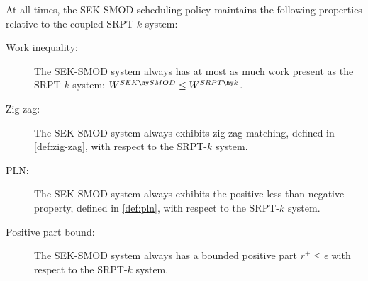 \documentclass[acmsmall]{acmart}
\begin{document}
\begin{lemma}
    \label{lem:sek-bridge}
    At all times, the SEK-SMOD scheduling policy maintains the following properties relative
    to the coupled SRPT-$k$ system:
    \begin{description}
        \item[Work inequality:] The SEK-SMOD system always has at most as much work present as the SRPT-$k$ system: $W^{SEK \hy SMOD} \le W^{SRPT\hy k}$.
        \item[Zig-zag:] The SEK-SMOD system always exhibits zig-zag matching, defined in \cref{def:zig-zag}, with respect to the SRPT-$k$ system.
        \item[PLN:] The SEK-SMOD system always exhibits the positive-less-than-negative property, defined in \cref{def:pln}, with respect to the SRPT-$k$ system.
        \item[Positive part bound:] The SEK-SMOD system always has a bounded positive part $r^+ \le \epsilon$ with respect to the SRPT-$k$ system.
    \end{description}
\end{lemma}
\end{document}
